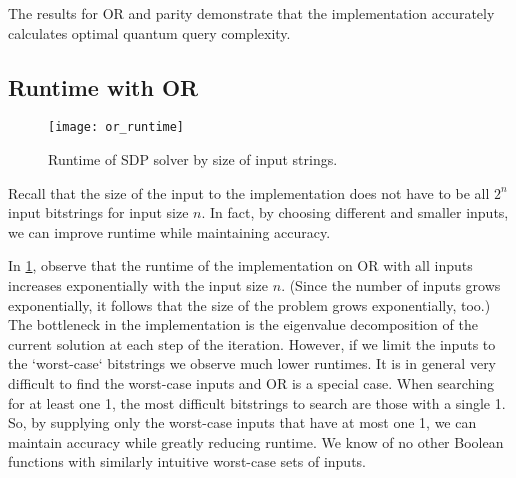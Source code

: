 The results for OR and parity demonstrate
that the implementation accurately calculates
optimal quantum query complexity.

\subsection{Runtime with OR}

\begin{figure}[H]
\centering
\texttt{[image: or\_runtime]}
\caption{Runtime of SDP solver by size of input strings.}
\label{fig:or_runtime}
\end{figure}

Recall that the size of the input to the implementation
does not have to be all $2^n$ input bitstrings
for input size $n$. In fact,
by choosing different and smaller inputs,
we can improve runtime while maintaining accuracy.

In \cref{fig:or_runtime}, observe that the
runtime of the implementation on OR with all
inputs increases exponentially
with the input size $n$.
(Since the number of inputs grows exponentially,
it follows that the size of the problem grows
exponentially, too.)
The bottleneck in the implementation is
the eigenvalue decomposition of the current
solution at each step of the iteration.
However, if we limit the inputs to the `worst-case`
bitstrings we observe much lower runtimes.
It is in general very difficult to find the worst-case
inputs and OR is a special case.
When searching for at least one 1, the most
difficult bitstrings to search are those with a single 1.
So, by supplying only the worst-case inputs that
have at most one 1, we can maintain accuracy while
greatly reducing runtime.
We know of no other Boolean functions with
similarly intuitive worst-case sets of inputs.
